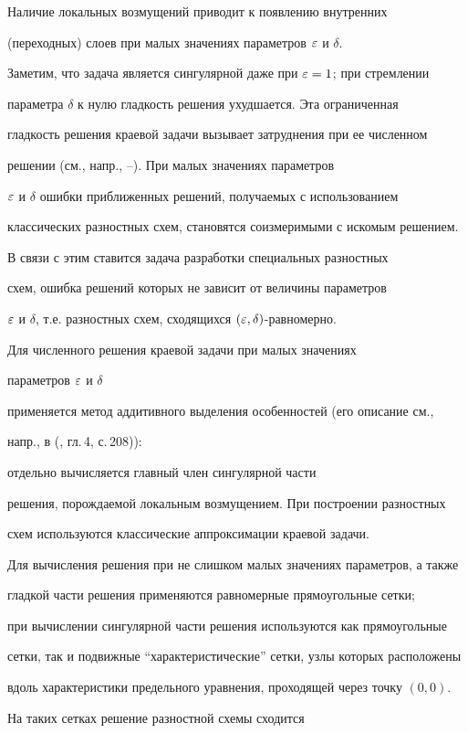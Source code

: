 Наличие локальных возмущений приводит к появлению внутренних


(переходных) слоев при малых значениях параметров $\varepsilon$ и $\delta$.


Заметим, что задача является сингулярной даже при $\varepsilon=1$; при стремлении


параметра $\delta$ к нулю гладкость решения ухудшается. Эта ограниченная


гладкость решения краевой задачи вызывает затруднения при ее численном 


решении (см., напр., \cite{Ba}--\cite{Sh1}). При малых значениях параметров 


$\varepsilon$ и $\delta$ ошибки приближенных решений, получаемых с использованием


классических разностных схем, становятся соизмеримыми с искомым решением.


В связи с этим ставится задача разработки специальных разностных


схем, ошибка решений которых не зависит от величины параметров


$\varepsilon$ и $\delta$, т.е. разностных схем, сходящихся $(\varepsilon,\delta)$-равномерно.





Для численного решения краевой задачи при малых значениях 


параметров $\varepsilon$ и $\delta$


применяется метод аддитивного выделения особенностей (его описание см., 


напр., в (\cite{Mar}, гл.\,4, с.\,208)):


отдельно вычисляется главный член сингулярной части


решения, порождаемой локальным возмущением. При построении разностных


схем используются классические аппроксимации краевой задачи. 


Для вычисления решения при не слишком малых значениях параметров, а также


гладкой части решения применяются равномерные прямоугольные сетки;


при вычислении сингулярной части решения используются как прямоугольные 


сетки, так и подвижные ``характеристические'' сетки, узлы которых расположены


вдоль характеристики предельного уравнения, проходящей через точку $(0,0).$


На таких сетках решение разностной схемы сходится 


